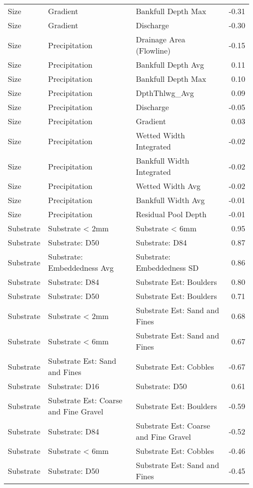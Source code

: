 \documentclass[
  12pt,
]{article}
\begin{document}
\begin{longtable}[t]{>{\raggedright\arraybackslash}p{1in}>{\raggedright\arraybackslash}p{2in}>{\raggedright\arraybackslash}p{2in}r}
Size & Gradient & Bankfull Depth Max & -0.31\\
Size & Gradient & Discharge & -0.30\\
\addlinespace
Size & Precipitation & Drainage Area (Flowline) & -0.15\\
Size & Precipitation & Bankfull Depth Avg & 0.11\\
Size & Precipitation & Bankfull Depth Max & 0.10\\
Size & Precipitation & DpthThlwg\_Avg & 0.09\\
Size & Precipitation & Discharge & -0.05\\
\addlinespace
Size & Precipitation & Gradient & 0.03\\
Size & Precipitation & Wetted Width Integrated & -0.02\\
Size & Precipitation & Bankfull Width Integrated & -0.02\\
Size & Precipitation & Wetted Width Avg & -0.02\\
Size & Precipitation & Bankfull Width Avg & -0.01\\
\addlinespace
Size & Precipitation & Residual Pool Depth & -0.01\\
\hline
Substrate & Substrate < 2mm & Substrate < 6mm & 0.95\\
Substrate & Substrate: D50 & Substrate: D84 & 0.87\\
Substrate & Substrate: Embeddedness Avg & Substrate: Embeddedness SD & 0.86\\
Substrate & Substrate: D84 & Substrate Est: Boulders & 0.80\\
\addlinespace
Substrate & Substrate: D50 & Substrate Est: Boulders & 0.71\\
Substrate & Substrate < 2mm & Substrate Est: Sand and Fines & 0.68\\
Substrate & Substrate < 6mm & Substrate Est: Sand and Fines & 0.67\\
Substrate & Substrate Est: Sand and Fines & Substrate Est: Cobbles & -0.67\\
Substrate & Substrate: D16 & Substrate: D50 & 0.61\\
\addlinespace
Substrate & Substrate Est: Coarse and Fine Gravel & Substrate Est: Boulders & -0.59\\
Substrate & Substrate: D84 & Substrate Est: Coarse and Fine Gravel & -0.52\\
Substrate & Substrate < 6mm & Substrate Est: Cobbles & -0.46\\
Substrate & Substrate: D50 & Substrate Est: Sand and Fines & -0.45\\

\end{longtable}
\end{document}

